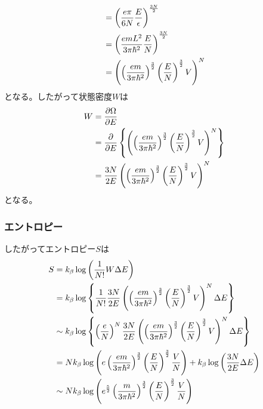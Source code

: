 \documentclass[dvipdfmx, 11pt, a4paper]{jsarticle}
\theoremstyle{definition}
\begin{document}
\begin{derivationBox}
\begin{align}
            &=\left( \frac{e\pi }{6 N} \frac{E}{\epsilon} \right)^{\frac{3N}{2}} \notag \\
            &= \left( \frac{emL^2 }{3 \pi \hbar^2} \frac{E}{N} \right)^{\frac{3N}{2}} \notag \\
            &= \left( \left( \frac{em}{3 \pi \hbar^2} \right)^{\frac{3}{2}} \left( \frac{E}{N} \right)^{\frac{3}{2}} V \right)^{N} \notag 
        \end{align}
        となる。したがって状態密度$W$は
        \begin{align}
            W  &= \frac{\partial \Omega}{\partial E} \notag \\
            &= \frac{\partial}{\partial E} \left\{ \left( \left( \frac{em}{3 \pi \hbar^2} \right)^{\frac{3}{2}} \left( \frac{E}{N} \right)^{\frac{3}{2}} V \right)^{N} \right\} \notag \\
            &= \frac{3N}{2E} \left( \left( \frac{em}{3 \pi \hbar^2} \right)^{\frac{3}{2}} \left( \frac{E}{N} \right)^{\frac{3}{2}} V \right)^{N} \notag
        \end{align}
        となる。
    \end{derivationBox}
\subsubsection{エントロピー}
    したがってエントロピー$S$は
    \begin{align}
        S &= k_\beta \log \left( \frac{1}{N!} W \Delta E \right) \notag \\
        &= k_\beta \log \left\{ \frac{1}{N!}\frac{3N}{2E} \left( \left( \frac{em}{3 \pi \hbar^2} \right)^{\frac{3}{2}} \left( \frac{E}{N} \right)^{\frac{3}{2}} V \right)^{N} \Delta E \right\} \notag \\
        &\sim k_\beta \log \left\{ \left( \frac{e}{N} \right)^N \frac{3N}{2E} \left( \left( \frac{em}{3 \pi \hbar^2} \right)^{\frac{3}{2}} \left( \frac{E}{N} \right)^{\frac{3}{2}} V \right)^{N} \Delta E \right\} \notag \\
        &= Nk_\beta \log \left( e\left( \frac{em}{3 \pi \hbar^2} \right)^{\frac{3}{2}} \left( \frac{E}{N} \right)^{\frac{3}{2}} \frac{V}{N} \right) + k_\beta \log \left( \frac{3N}{2E} \Delta E \right) \notag \\
        &\sim Nk_\beta \log \left( e^{\frac{5}{2}} \left(\frac{m}{3 \pi \hbar^2} \right)^{\frac{3}{2}} \left( \frac{E}{N} \right)^{\frac{3}{2}} \frac{V}{N} \right)
    \end{align}
\end{document}
